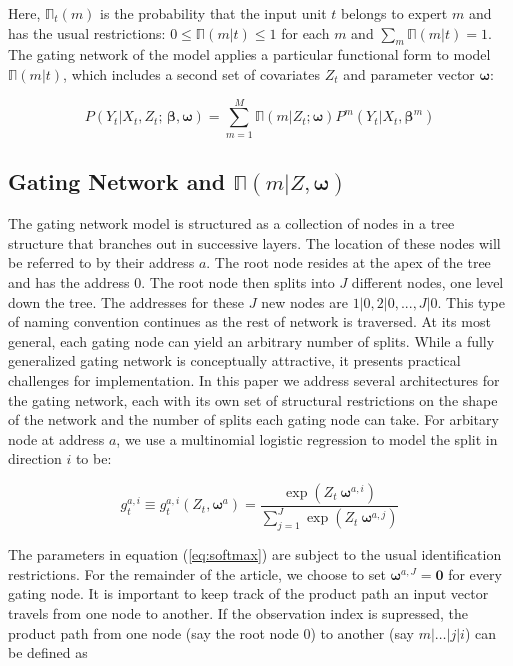 \documentclass[12pt]{article}
\newcommand{\expmixwt}[0]{\mathbb{\Pi}}
\begin{document}
Here, $\expmixwt_{t}(m)$ is the probability that the input unit $t$ belongs
to expert $m$ and has the usual restrictions: $0 \leq \expmixwt(m|t) \leq 1$
for each $m$ and $\sum_{m} \expmixwt(m|t) = 1$. The gating network of the model
applies a particular functional form to model $\expmixwt(m|t)$, which includes a
second set of covariates $Z_{t}$ and parameter vector $\boldsymbol{\omega}$:

\begin{equation} \label{eq:mixture}
  P(Y_{t} | X_{t}, Z_{t}; \, \boldsymbol{\beta}, \boldsymbol{\omega}) = \sum_{m=1}^{M} \expmixwt(m | Z_{t}; \boldsymbol{\omega}) P^{m}(Y_{t} | X_{t}, \boldsymbol{\beta}^{m})
\end{equation}


\subsection{Gating Network and $\expmixwt(m | Z, \boldsymbol{\omega})$} \label{subsec:GatingNetwork}

The gating network model is structured as a collection of nodes in a tree
structure that branches out in successive layers. The location of these nodes will
be referred to by their address $a$. The root node resides at the apex of the tree
and has the address $0$. The root node then splits into $J$ different nodes,
one level down the tree. The addresses for these $J$ new nodes are 
$1|0, 2|0, ..., J|0$. This type of naming convention continues as the
rest of network is traversed. At its most general, each gating node can yield an
arbitrary number of splits. While a fully generalized gating network is
conceptually attractive, it presents practical challenges for implementation.
In this paper we address several architectures for the gating network, each
with its own set of structural restrictions on the shape of the network and
the number of splits each gating node can take. For arbitary node at address $a$,
we use a multinomial logistic regression to model the split in direction $i$ to be:

\begin{equation} \label{eq:softmax}
  g^{a,i}_{t} \equiv g^{a,i}_{t}(Z_{t}, \boldsymbol{\omega}^{a}) = \frac{\exp(Z_{t} \ \boldsymbol{\omega}^{a,i})}{\sum^{J}_{j=1} {\exp(Z_{t} \ \boldsymbol{\omega}^{a,j})}}
\end{equation}

The parameters in equation (\ref{eq:softmax}) are subject to the usual
identification restrictions. For the remainder of the article, we choose
to set $\boldsymbol{\omega}^{a,J} = \boldsymbol{0}$ for every gating node.
It is important to keep track of the product path an input vector travels from
one node to another. If the observation index is supressed, the product path
from one node (say the root node $0$) to another (say $m|\ldots|j|i$)
can be defined as
\end{document}
